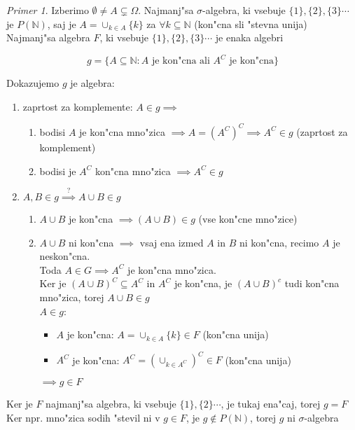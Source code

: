 \documentclass[a4paper,12pt]{article}
\theoremstyle{definition}
\theoremstyle{remark}
\newtheorem*{ex}{Primer}
\newcommand{\N}{\mathbb{N}}
\begin{document}
\begin{ex}
    Izberimo $\emptyset \neq A \subsetneq \Omega$. Najmanj"sa $\sigma$-algebra, ki vsebuje $\{1\}, \{2\}, \{3\} \cdots$
    je $P(\N)$, saj je $A = \cup_{k \in A} \{k\}$ za $\forall k \subseteq \N$ (kon"cna sli "stevna unija) \\
    Najmanj"sa algebra $F$, ki vsebuje $\{1\}, \{2\}, \{3\} \cdots$ je enaka algebri

    \begin{equation*}
        g = \{A \subseteq \N: A \text{ je kon"cna ali } A^C \text{ je kon"cna}\}
    \end{equation*}

    Dokazujemo $g$ je algebra:
    
    \begin{enumerate}
        \item zaprtost za komplemente: $A \in g \implies$
        \begin{enumerate}
            \item bodisi $A$ je kon"cna mno"zica $\implies A = (A^C)^C \implies A^C \in g$ (zaprtost za komplement)
            \item bodisi je $A^C$ kon"cna mno"zica $\implies A^C \in g$
        \end{enumerate}
        \item $A,B \in g \stackrel{?}{\implies} A \cup B \in g$
        \begin{enumerate}
            \item $A \cup B$ je kon"cna $\implies (A \cup B) \in g$ (vse kon"cne mno"zice)
            \item $A \cup B$ ni kon"cna $\implies$ vsaj ena izmed $A$ in $B$ ni kon"cna, recimo $A$ je neskon"cna. \\
                Toda $A \in G \implies A^C$ je kon"cna mno"zica. \\
                Ker je $(A \cup B)^C \subseteq A^C$ in $A^C$ je kon"cna, je $(A \cup B)^c$ tudi kon"cna mno"zica,
                torej $A \cup B \in g$ \\
                $A \in g$:
                \begin{itemize}
                    \item $A$ je kon"cna: $A = \cup_{k \in A} \{k\} \in F$ (kon"cna unija)
                    \item $A^C$ je kon"cna: $A^C = (\cup_{k \in A^C})^C \in F$ (kon"cna unija)
                \end{itemize}
                $\implies g \in F$
        \end{enumerate}
    \end{enumerate}

    Ker je $F$ najmanj"sa algebra, ki vsebuje $\{1\}, \{2\} \cdots$, je tukaj ena"caj, torej $g = F$ \\
    Ker npr. mno"zica sodih "stevil ni v $g \in F$, je $g \notin P(\N)$, torej $g$ ni $\sigma$-algebra
\end{ex}
\end{document}
